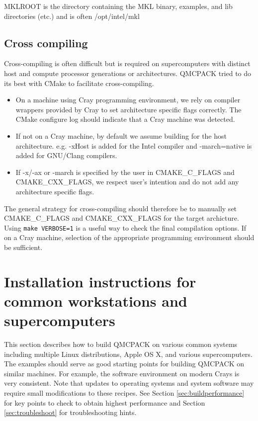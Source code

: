 MKLROOT is the directory containing the MKL binary, examples, and lib
directories (etc.) and is often /opt/intel/mkl

\subsection{Cross compiling}
Cross-compiling is often difficult but is required on supercomputers
with distinct host and compute processor generations or architectures.
QMCPACK tried to do its best with CMake to facilitate cross-compiling.

\begin{itemize}
  \item On a machine using Cray programming environment, we rely on
      compiler wrappers provided by Cray to set architecture specific
      flags correctly. The CMake configure log should indicate that a
      Cray machine was detected.
  \item If not on a Cray machine, by default we assume building for
    the host architecture. e.g. -xHost is added for the Intel compiler
    and -march=native is added for GNU/Clang compilers.
  \item If -x/-ax or -march is specified by the user in CMAKE\_C\_FLAGS and CMAKE\_CXX\_FLAGS,
    we respect user's intention and do not add any architecture specific flags.
\end{itemize}

The general strategy for cross-compiling should therefore be to
manually set CMAKE\_C\_FLAGS and CMAKE\_CXX\_FLAGS for the target
archicture. Using \texttt{make VERBOSE=1} is a useful way to check the
final compilation options.  If on a Cray machine, selection of the
appropriate programming environment should be sufficient.

\section{Installation instructions for common workstations and
  supercomputers}
\label{sec:installexamples}

This section describes how to build QMCPACK on various common systems
including multiple Linux distributions, Apple OS X, and various
supercomputers. The examples should serve as good starting points for
building QMCPACK on similar machines. For example, the software
environment on modern Crays is very consistent. Note that updates to
operating systems and system software may require small modifications
to these recipes. See Section \ref{sec:buildperformance} for key
points to check to obtain highest performance and
Section \ref{sec:troubleshoot} for troubleshooting hints.

